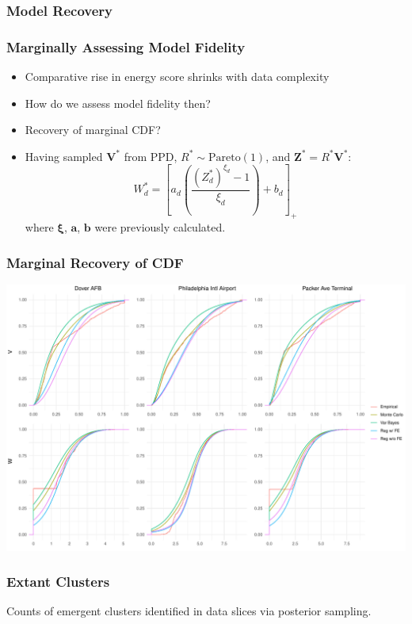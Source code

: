 \documentclass[aspectratio=169,10pt,notes]{beamer}
\newlength{\frametextheight}
\begin{document}
\subsubsection{Model Recovery}

\begin{frame}
    \frametitle{Marginally Assessing Model Fidelity}
    \begin{itemize}
        \item Comparative rise in energy score shrinks with data complexity
        \item How do we assess model fidelity then?
        \item Recovery of marginal CDF?
        \item Having sampled $\bm{V}^*$ from PPD, $R^*\sim\text{Pareto}(1)$, and $\bm{Z}^* = R^*\bm{V}^*$:
        \[
             W_d^* = \left[a_d\left(\frac{(Z_d^*)^{\xi_d} - 1}{\xi_d}\right) + b_d\right]_+
        \]
        where $\bm{\xi}$, $\bm{a}$, $\bm{b}$ were previously calculated.
    \end{itemize}
\end{frame} %

\begin{frame}
    \frametitle{Marginal Recovery of CDF}
    \begin{center}
        \includegraphics[height=0.99\frametextheight]{./ch3/plots/delaware_marginal_cdfs}
    \end{center}
\end{frame} %

\begin{frame}
    \frametitle{Extant Clusters}
    \begin{center}
        
    \end{center}
    {\footnotesize Counts of emergent clusters identified in data slices via posterior sampling.}
\end{frame} %
\end{document}
